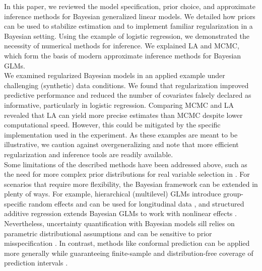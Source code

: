 In this paper, we reviewed the model specification, prior choice, and approximate inference methods for Bayesian generalized linear models.
We detailed how priors can be used to stabilize estimation and to implement familiar regularization in a Bayesian setting.
Using the example of logistic regression, we demonstrated the necessity of numerical methods for inference.
We explained LA and MCMC, which form the basis of modern approximate inference methods for Bayesian GLMs.\\

We examined regularized Bayesian models in an applied example under challenging (synthetic) data conditions.
We found that regularization improved predictive performance and reduced the number of covariates falsely declared as informative, particularly in logistic regression.
Comparing MCMC and LA revealed that LA can yield more precise estimates than MCMC despite lower computational speed.
However, this could be mitigated by the specific implementation used in the experiment.
As these examples are meant to be illustrative, we caution against overgeneralizing and note that more efficient regularization and inference tools are readily available.\\

Some limitations of the described methods have been addressed above, such as the need for more complex prior distributions for real variable selection in .
For scenarios that require more flexibility, the Bayesian framework can be extended in plenty of ways.
For example, 
hierarchical (multilevel) GLMs introduce group-specific random effects and can be used for longitudinal data \citep{gelman_weakly_2008}, and structured additive regression extends Bayesian GLMs to work with nonlinear effects \citep{fahrmeir_bayesian_2010}.
Nevertheless, uncertainty quantification with Bayesian models sill relies on parametric distributional assumptions and can be sensitive to prior misspecification \citep{piironen_comparison_2017}. In contrast, methods like conformal prediction can be applied more generally while guaranteeing finite-sample and  distribution-free coverage of prediction intervals \citep[see e.g.][]{angelopoulos_gentle_2022}.